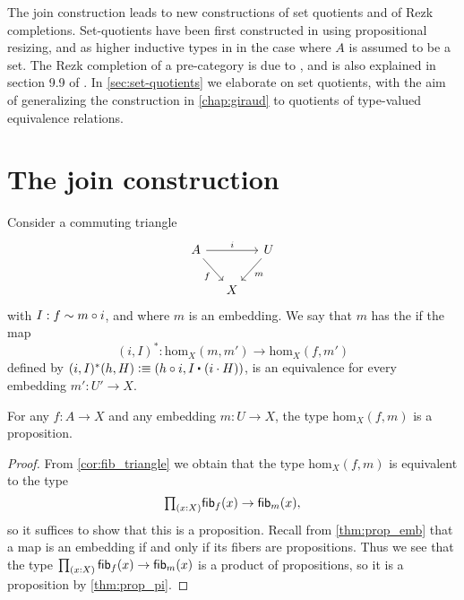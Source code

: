 The join construction leads to new constructions of set quotients and of Rezk completions. Set-quotients have been first constructed in \cite{UniMath2015,UniMath} using propositional resizing, and as higher inductive types in \cite{hottbook} in the case where $A$ is assumed to be a set. The Rezk completion of a pre-category is due to \cite{AhrensKapulkinShulman}, and is also explained in section 9.9 of \cite{hottbook}. In \cref{sec:set-quotients} we elaborate on set quotients, with the aim of generalizing the construction in \cref{chap:giraud} to quotients of type-valued equivalence relations.

\section{The join construction}

\begin{defn}\label{defn:image_up}
Consider a commuting triangle
\begin{equation*}
\begin{tikzcd}[column sep=small]
A \arrow[rr,"i"] \arrow[dr,swap,"f"] & & U \arrow[dl,"m"] \\
& X
\end{tikzcd}
\end{equation*}
with $I:f\sim m\circ i$, and where $m$ is an embedding.
We say that $m$ has the  if the map
\begin{equation*}
(i,I)^\ast : \mathrm{hom}_X(m,m')\to\mathrm{hom}_X(f,m')
\end{equation*}
defined by $(i,I)^\ast(h,H)\defeq (h\circ i,\ct{I}{(i\cdot H)})$,
is an equivalence for every embedding $m':U'\to X$. 
\end{defn}

\begin{lem}
For any $f:A\to X$ and any embedding $m:U\to X$, the type $\mathrm{hom}_X(f,m)$ is a proposition.
\end{lem}

\begin{proof}
From \cref{cor:fib_triangle} we obtain that the type $\mathrm{hom}_X(f,m)$ is equivalent to the type
\begin{equation*}
\prd{x:X}\fib{f}{x}\to\fib{m}{x},
\end{equation*}
so it suffices to show that this is a proposition. 
Recall from \cref{thm:prop_emb} that a map is an embedding if and only if its fibers are propositions.
Thus we see that the type $\prd{x:X}\fib{f}{x}\to\fib{m}{x}$ is a product of propositions, so it is a proposition by \cref{thm:prop_pi}.
\end{proof}

